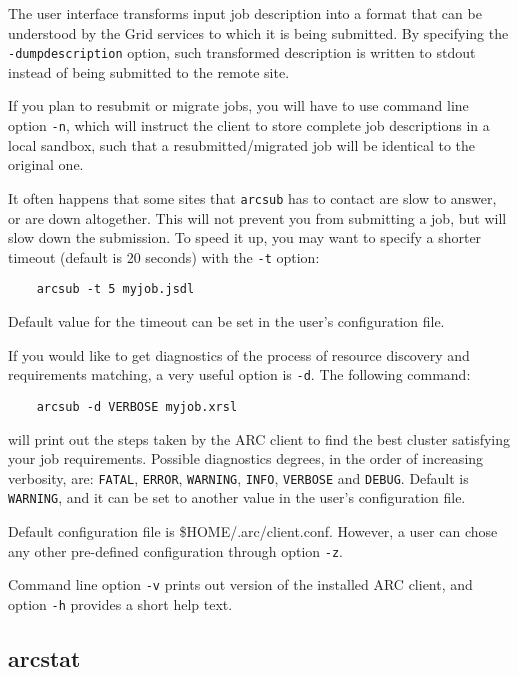 The user interface transforms input job description into a format
that can be understood by the Grid services to which it is being
submitted. By specifying the \verb#-dumpdescription# option, such transformed
description is written to stdout instead of being submitted to the remote site.



If you plan to resubmit or migrate jobs, you will have to use command line
option \verb#-n#, which will instruct the client to store complete job descriptions
in a local sandbox, such that a resubmitted/migrated job will be identical to the
original one.

It often happens that some sites that \verb#arcsub# has to contact
are slow to answer, or are down altogether. This will not prevent
you from submitting a job, but will slow down the submission. To
speed it up, you may want to specify a shorter timeout (default is
20 seconds) with the \verb#-t# option:
\begin{verbatim}
    arcsub -t 5 myjob.jsdl
\end{verbatim}

Default value for the timeout can be set in the user's configuration file.

If you would like to get diagnostics of the process of resource
discovery and requirements matching, a very useful option is
\verb#-d#. The following command:
\begin{verbatim}
    arcsub -d VERBOSE myjob.xrsl
\end{verbatim}

will print out the steps taken by the ARC client to find the
best cluster satisfying your job requirements. Possible diagnostics degrees, in the
order of increasing verbosity, are: \texttt{FATAL}, \texttt{ERROR}, \texttt{WARNING},
\texttt{INFO}, \texttt{VERBOSE} and \texttt{DEBUG}. Default is \texttt{WARNING}, and
it can be set to another value in the user's configuration file.

Default configuration file is {\$}HOME/.arc/client.conf. However, a user can chose any
other pre-defined configuration through option \verb#-z#.

Command line option \verb#-v# prints out version of the installed ARC client, and option
\verb#-h# provides a short help text.


\subsection{arcstat}
\label{sec:arcstat}

